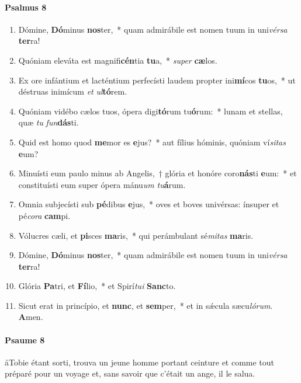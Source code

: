 \documentclass[twoside]{article}
\begin{document}
\begin{paracol}[1]{2}
\switchcolumn*

\paragraph{Psalmus 8}


\begin{enumerate}[wide, itemsep=0mm, labelwidth=!, labelindent=0pt, label=\color{gregoriocolor}\theenumi]
\item Dómine, \textbf{Dó}minus \textbf{nos}ter,~* quam admirábile est nomen tuum in uni\textit{vér}\textit{sa} \textbf{ter}ra!
\item Quóniam eleváta est magnifi\textbf{cén}tia \textbf{tu}a,~* \textit{su}\textit{per} \textbf{cæ}los.
\item Ex ore infántium et lacténtium perfecísti laudem propter ini\textbf{mí}cos \textbf{tu}os,~* ut déstruas inimícum \textit{et} \textit{ul}\textbf{tó}rem.
\item Quóniam vidébo cælos tuos, ópera digi\textbf{tó}rum tu\textbf{ó}rum:~* lunam et stellas, quæ \textit{tu} \textit{fun}\textbf{dás}ti.
\item Quid est homo quod \textbf{me}mor es \textbf{e}jus?~* aut fílius hóminis, quóniam ví\textit{si}\textit{tas} \textbf{e}um?
\item Minuísti eum paulo minus ab Angelis,~† glória et honóre coro\textbf{nás}ti \textbf{e}um:~* et constituísti eum super ópera mánu\textit{um} \textit{tu}\textbf{á}rum.
\item Omnia subjecísti sub \textbf{pé}dibus \textbf{e}jus,~* oves et boves univérsas: ínsuper et pé\textit{co}\textit{ra} \textbf{cam}pi.
\item Vólucres cæli, et \textbf{pi}sces \textbf{ma}ris,~* qui perámbulant sé\textit{mi}\textit{tas} \textbf{ma}ris.
\item Dómine, \textbf{Dó}minus \textbf{nos}ter,~* quam admirábile est nomen tuum in uni\textit{vér}\textit{sa} \textbf{ter}ra!
\item Glória \textbf{Pa}tri, et \textbf{Fí}lio,~* et Spirí\textit{tu}\textit{i} \textbf{Sanc}to.
\item Sicut erat in princípio, et \textbf{nunc}, et \textbf{sem}per,~* et in sǽcula sæcu\textit{ló}\textit{rum}. \textbf{A}men.
\end{enumerate}

\switchcolumn

\paragraph{Psaume 8}
\aa Tobie étant sorti, trouva un jeune homme portant ceinture et comme tout préparé pour un voyage et, sans savoir que c’était un ange, il le salua.


\end{paracol}
\end{document}
